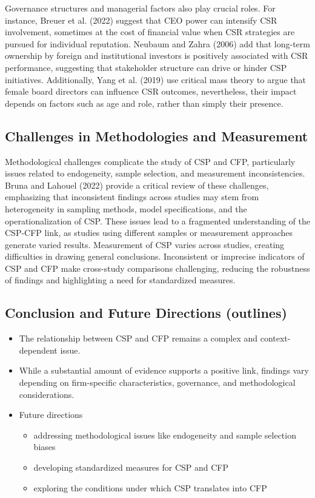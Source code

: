 \documentclass[
  letterpaper,
  DIV=11,
  numbers=noendperiod]{scrartcl}
\providecommand{\tightlist}{%
  \setlength{\itemsep}{0pt}\setlength{\parskip}{0pt}}\usepackage{longtable,booktabs,array}
\begin{document}
Governance structures and managerial factors also play crucial roles.
For instance, Breuer et al. (2022) suggest that CEO power can intensify
CSR involvement, sometimes at the cost of financial value when CSR
strategies are pursued for individual reputation. Neubaum and Zahra
(2006) add that long-term ownership by foreign and institutional
investors is positively associated with CSR performance, suggesting that
stakeholder structure can drive or hinder CSP initiatives. Additionally,
Yang et al. (2019) use critical mass theory to argue that female board
directors can influence CSR outcomes, nevertheless, their impact depends
on factors such as age and role, rather than simply their presence.

\subsection{Challenges in Methodologies and
Measurement}\label{challenges-in-methodologies-and-measurement}

Methodological challenges complicate the study of CSP and CFP,
particularly issues related to endogeneity, sample selection, and
measurement inconsistencies. Bruna and Lahouel (2022) provide a critical
review of these challenges, emphasizing that inconsistent findings
across studies may stem from heterogeneity in sampling methods, model
specifications, and the operationalization of CSP. These issues lead to
a fragmented understanding of the CSP-CFP link, as studies using
different samples or measurement approaches generate varied results.
Measurement of CSP varies across studies, creating difficulties in
drawing general conclusions. Inconsistent or imprecise indicators of CSP
and CFP make cross-study comparisons challenging, reducing the
robustness of findings and highlighting a need for standardized
measures.

\subsection{Conclusion and Future Directions
(outlines)}\label{conclusion-and-future-directions-outlines}

\begin{itemize}
\tightlist
\item
  The relationship between CSP and CFP remains a complex and
  context-dependent issue.
\item
  While a substantial amount of evidence supports a positive link,
  findings vary depending on firm-specific characteristics, governance,
  and methodological considerations.
\item
  Future directions

  \begin{itemize}
  \tightlist
  \item
    addressing methodological issues like endogeneity and sample
    selection biases
  \item
    developing standardized measures for CSP and CFP
  \item
    exploring the conditions under which CSP translates into CFP
  \end{itemize}
\end{itemize}
\end{document}
